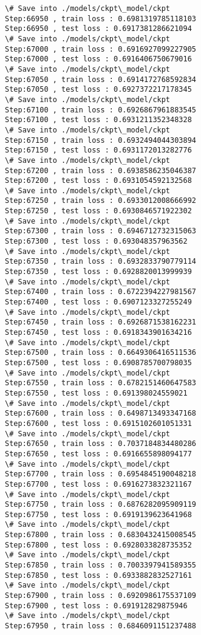 \documentclass[11pt]{article}
\begin{document}
\begin{Verbatim}[commandchars=\\\{\}]
\# Save into ./models/ckpt\_model/ckpt
Step:66950 , train loss : 0.6981319785118103
Step:66950 , test loss : 0.6917381286621094
\# Save into ./models/ckpt\_model/ckpt
Step:67000 , train loss : 0.6916927099227905
Step:67000 , test loss : 0.6916406750679016
\# Save into ./models/ckpt\_model/ckpt
Step:67050 , train loss : 0.6914172768592834
Step:67050 , test loss : 0.6927372217178345
\# Save into ./models/ckpt\_model/ckpt
Step:67100 , train loss : 0.6926867961883545
Step:67100 , test loss : 0.6931211352348328
\# Save into ./models/ckpt\_model/ckpt
Step:67150 , train loss : 0.6932494044303894
Step:67150 , test loss : 0.6931172013282776
\# Save into ./models/ckpt\_model/ckpt
Step:67200 , train loss : 0.6938586235046387
Step:67200 , test loss : 0.6931054592132568
\# Save into ./models/ckpt\_model/ckpt
Step:67250 , train loss : 0.6933012008666992
Step:67250 , test loss : 0.6930846571922302
\# Save into ./models/ckpt\_model/ckpt
Step:67300 , train loss : 0.6946712732315063
Step:67300 , test loss : 0.693048357963562
\# Save into ./models/ckpt\_model/ckpt
Step:67350 , train loss : 0.6932833790779114
Step:67350 , test loss : 0.6928820013999939
\# Save into ./models/ckpt\_model/ckpt
Step:67400 , train loss : 0.6722394227981567
Step:67400 , test loss : 0.6907123327255249
\# Save into ./models/ckpt\_model/ckpt
Step:67450 , train loss : 0.6926871538162231
Step:67450 , test loss : 0.6918343901634216
\# Save into ./models/ckpt\_model/ckpt
Step:67500 , train loss : 0.6649306416511536
Step:67500 , test loss : 0.6908785700798035
\# Save into ./models/ckpt\_model/ckpt
Step:67550 , train loss : 0.6782151460647583
Step:67550 , test loss : 0.691398024559021
\# Save into ./models/ckpt\_model/ckpt
Step:67600 , train loss : 0.6498713493347168
Step:67600 , test loss : 0.6915102601051331
\# Save into ./models/ckpt\_model/ckpt
Step:67650 , train loss : 0.7037184834480286
Step:67650 , test loss : 0.6916655898094177
\# Save into ./models/ckpt\_model/ckpt
Step:67700 , train loss : 0.6954845190048218
Step:67700 , test loss : 0.6916273832321167
\# Save into ./models/ckpt\_model/ckpt
Step:67750 , train loss : 0.6876282095909119
Step:67750 , test loss : 0.6919139623641968
\# Save into ./models/ckpt\_model/ckpt
Step:67800 , train loss : 0.6830432415008545
Step:67800 , test loss : 0.6928033828735352
\# Save into ./models/ckpt\_model/ckpt
Step:67850 , train loss : 0.7003397941589355
Step:67850 , test loss : 0.6933882832527161
\# Save into ./models/ckpt\_model/ckpt
Step:67900 , train loss : 0.6920986175537109
Step:67900 , test loss : 0.691912829875946
\# Save into ./models/ckpt\_model/ckpt
Step:67950 , train loss : 0.6846091151237488

\end{Verbatim}
\end{document}
